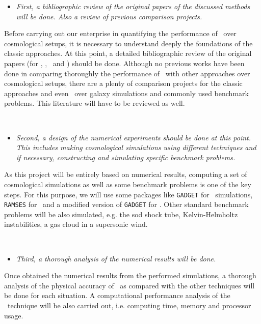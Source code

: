 \documentclass[a4,useAMS,usenatbib,usegraphicx,12pt]{article}
\begin{document}
\begin{itemize}
\item[\checkmark] \textit{First, a bibliographic review of the original papers 
of the discussed methods will be done. Also a review of previous comparison 
projects.}
\end{itemize}


Before carrying out our enterprise in quantifying the performance of \VPH\ over
cosmological setups, it is necessary to understand deeply the foundations of 
the classic approaches. At this point, a detailed bibliographic review of the 
original papers (for \SPH, \AMR, \VPH\ and \AREPO) should be done. Although no 
previous works have been done in comparing thoroughly the performance of \VPH\
with other approaches over cosmological setups, there are a plenty of comparison
projects for the classic approaches and even \AREPO\ over galaxy simulations and 
commonly used benchmark problems. This literature will have to be reviewed as 
well.

\

\begin{itemize}
\item[\checkmark] \textit{Second, a design of the numerical experiments should 
be done at this point. This includes making cosmological simulations using 
different techniques and if necessary, constructing and simulating specific 
benchmark problems.}
\end{itemize}


As this project will be entirely based on numerical results, computing a set of
cosmological simulations as well as some benchmark problems is one of the key 
steps. For this purpose, we will use some packages like \texttt{GADGET} 
\citet{Springel05} for \SPH\ simulations, \texttt{RAMSES} \citet{Teyssier02} 
for \AMR\ and a modified version of \texttt{GADGET} for \VPH. Other standard 
benchmark problems will be also simulated, e.g. the sod shock tube, 
Kelvin-Helmholtz instabilities, a gas cloud in a supersonic wind.

\

\begin{itemize}
\item[\checkmark] \textit{Third, a thorough analysis of the numerical results 
will be done.}
\end{itemize}


Once obtained the numerical results from the performed simulations, a thorough
analysis of the physical accuracy of \VPH\ as compared with the other techniques
will be done for each situation. A computational performance analysis of the 
\VPH\ technique will be also carried out, i.e. computing time, memory and 
processor usage.
\end{document}
